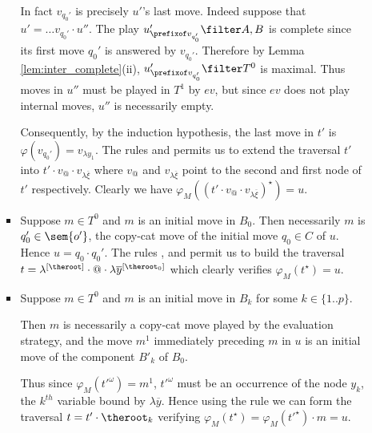 \begin{itemize}[$\bullet$]
\begin{enumerate}
\begin{itemize}
    In fact $v_{q_0'}$ is precisely $u'$'s last move. Indeed
    suppose that $u' = \ldots v_{q_0'} \cdot u''$. The play
    $u'_{\prefixof v_{q_0'}}\filter A,B$ is complete since its
    first move $q_0'$ is answered by $v_{q_0'}$. Therefore by
    Lemma \ref{lem:inter_complete}(ii), $u'_{\prefixof
    v_{q_0'}}\filter T^0$ is maximal. Thus moves in $u''$ must
    be played in $T^1$ by $ev$, but since $ev$ does not play internal
    moves, $u''$ is necessarily empty.

    Consequently, by the induction hypothesis, the last move in $t'$ is $\varphi(v_{q_0'}) = v_{\lambda y_1}$.
    The rules  and  permits us to extend
    the traversal $t'$ into $t' \cdot v_@ \cdot v_{\lambda \overline{\xi}}$ where $v_@$ and $v_{\lambda
    \overline{\xi}}$ point to the second and first node of $t'$ respectively. Clearly we have $\varphi_M((t'\cdot v_@ \cdot v_{\lambda \overline{\xi}})^\star) = u$.

    \item Suppose $m\in T^0$ and $m$ is an initial move in $B_0$.
    Then necessarily $m$ is $q_0' \in \sem{o'}$, the copy-cat move of the initial move $q_0 \in C$ of $u$. Hence $u = q_0 \cdot q_0'$. The rules , 
and  permit us to build the traversal $t =
\lambda^{[\theroot]} \cdot @ \cdot \lambda
\overline{y}^{[\theroot_0]}$ which clearly verifies
$\varphi_M(t^\star) = u$.

    \item Suppose $m\in T^0$ and $m$ is an initial move in $B_k$ for some $k\in \{1..p\}$.

    Then $m$ is necessarily a copy-cat move played by the evaluation strategy, and the move $m^1$ immediately preceding $m$ in $u$ is an initial move of the component $B'_k$ of $B_0$.

    Thus since $\varphi_M(t'^\omega) = m^1$, $t'^\omega$ must be an occurrence of the node $y_k$, the $k^{th}$ variable bound by $\lambda \overline{y}$. Hence using the rule  we can form the traversal $t= t' \cdot \theroot_k$ verifying $\varphi_M(t^\star) = \varphi_M(t'^\star) \cdot m = u$.



\end{itemize}
\end{enumerate}
\end{itemize}

